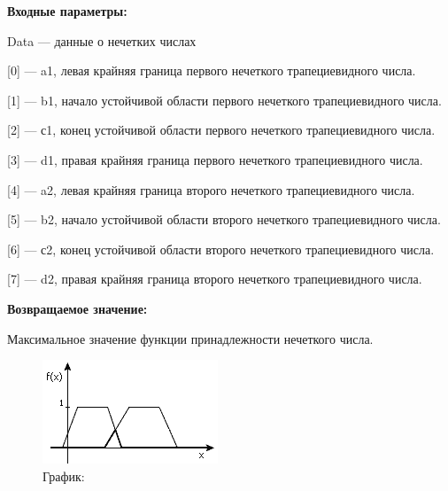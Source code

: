 \textbf{Входные параметры:}
 
Data --- данные о нечетких числах
 
[0] --- a1, левая крайняя граница первого нечеткого трапециевидного числа.
 
[1] --- b1, начало устойчивой области первого нечеткого трапециевидного числа.
 
[2] --- с1, конец устойчивой области первого нечеткого трапециевидного числа.
 
[3] --- d1, правая крайняя граница первого нечеткого трапециевидного числа.
 
[4] --- a2, левая крайняя граница второго нечеткого трапециевидного числа.
 
[5] --- b2, начало устойчивой области второго нечеткого трапециевидного числа.
 
[6] --- с2, конец устойчивой области второго нечеткого трапециевидного числа.
 
[7] --- d2, правая крайняя граница второго нечеткого трапециевидного числа.

\textbf{Возвращаемое значение:}
 
Максимальное значение функции принадлежности нечеткого числа.

 \begin{figure} [h] 
   \center
   \includegraphics {MHL_MaxiMinTrapeziformFuzzyNumbers.png}
   \caption{График:} 
   \label{img:MHL_MaxiMinTrapeziformFuzzyNumbers}  
 \end{figure}